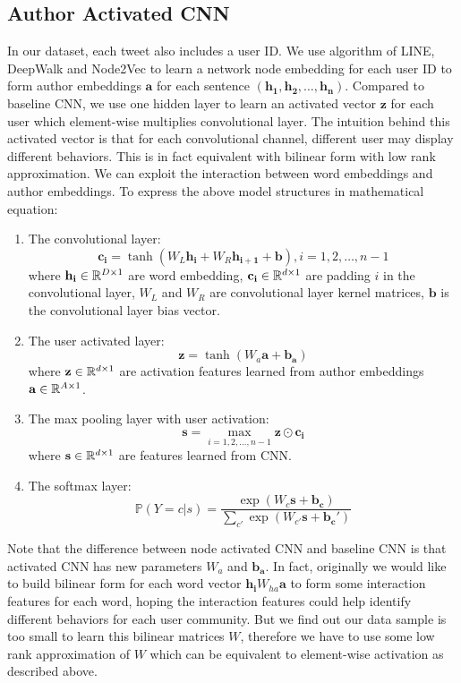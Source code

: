 \subsection*{Author Activated CNN}
In our dataset, each tweet also includes a user ID. We use algorithm of LINE, DeepWalk and Node2Vec to learn a network node embedding for each user ID to form author embeddings $\mathbf{a}$ for each sentence $(\mathbf{h_1},\mathbf{h_2},\ldots,\mathbf{h_n})$. Compared to baseline CNN, we use one hidden layer to learn an activated vector $\mathbf{z}$ for each user which element-wise multiplies convolutional layer. The intuition behind this activated vector is that for each convolutional channel, different user may display different behaviors. This is in fact equivalent with bilinear form with low rank approximation. We can exploit the interaction between word embeddings and author embeddings. To express the above model structures in mathematical equation:
\begin{enumerate}
	\item The convolutional layer:
\begin{equation}
	\mathbf{c_i} = \tanh(W_L\mathbf{h_i} + W_R \mathbf{h_{i+1}} + \mathbf{b}), i=1,2,\ldots,n-1
\end{equation}
where $\mathbf{h_i}\in \mathbb{R}^{D\times1}$ are word embedding, $\mathbf{c_i} \in \mathbb{R}^{d\times1}$ are padding $i$ in the convolutional layer, $W_L$ and $W_R$ are convolutional layer kernel matrices, $\mathbf{b}$ is the convolutional layer bias vector.
\item The user activated layer:
\begin{equation}
	\mathbf{z} = \tanh(W_a\mathbf{a}  + \mathbf{b_a})
\end{equation}
where $\mathbf{z} \in \mathbb{R}^{d \times 1}$ are activation features learned from author embeddings $\mathbf{a} \in \mathbb{R}^{A\times1}$.
\item The max pooling layer with user activation:
\begin{equation}
	\mathbf{s} = \max_{i=1,2,\ldots,n-1}\mathbf{z}\odot\mathbf{c_i}
\end{equation}
where $\mathbf{s} \in \mathbb{R}^{d \times 1}$ are features learned from CNN.
\item The softmax layer:
\begin{equation}
	\mathbb{P}(Y=c|s)=\frac{\exp(W_{c}\mathbf{s}+\mathbf{b_c})}{\sum_{c'}\exp(W_{c'}\mathbf{s}+\mathbf{b_c'})}
\end{equation}
\end{enumerate}
Note that the difference between node activated CNN and baseline CNN is that activated CNN has new parameters $W_a$ and $\mathbf{b_a}$. In fact, originally we would like to build bilinear form for each word vector $\mathbf{h_i} W_{ha} \mathbf{a}$ to form some interaction features for each word, hoping the interaction features could help identify different behaviors for each user community. But we find out our data sample is too small to learn this bilinear matrices $W$, therefore we have to use some low rank approximation of $W$ which can be equivalent to element-wise activation as described above.

